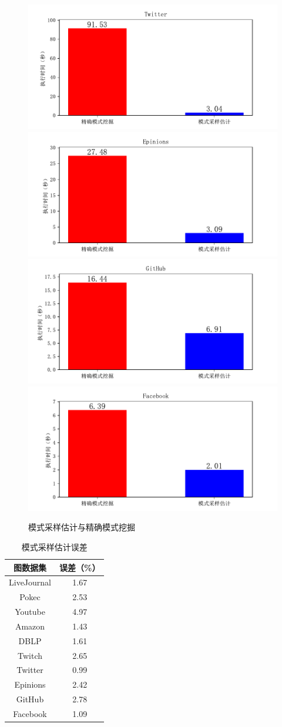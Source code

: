 \documentclass[master]{thesis-uestc}
\begin{document}
\begin{figure}
    \includegraphics[width=0.5\linewidth]{pic/samp-cmp-accurate/Twitter.pdf}%
    \includegraphics[width=0.5\linewidth]{pic/samp-cmp-accurate/Epinions.pdf}\\
    \includegraphics[width=0.5\linewidth]{pic/samp-cmp-accurate/GitHub.pdf}%
    \includegraphics[width=0.5\linewidth]{pic/samp-cmp-accurate/Facebook.pdf}
    \caption{模式采样估计与精确模式挖掘}
    \label{fig:samp-cmp-accurate}
\end{figure}

\begin{table}[t]
    \centering
    \caption{模式采样估计误差}
    \label{tab:samp-error}
    \begin{tabular}{c|c}
      \hline
      图数据集 & 误差（\%） \\\hline
      LiveJournal & 1.67     \\
      Pokec & 2.53 \\
      Youtube &4.97\\
      Amazon &1.43\\
      DBLP &1.61\\
      Twitch &2.65\\
      Twitter &0.99\\
      Epinions &2.42\\
      GitHub &2.78\\
      Facebook &1.09\\
    \end{tabular}
\end{table}
\end{document}
